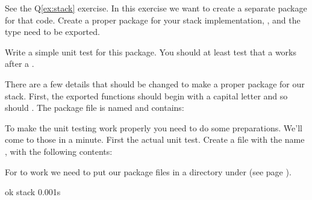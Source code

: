 \begin{Exercise}[title={Stack as package},difficulty=2]
\label{ex:stack-package}
\Question\label{ex:stack-package q1} 
See the Q\ref{ex:stack} exercise. In this exercise we want to create
a separate package for that code.
Create a proper package for your
stack implementation, ,  and the  type need to be
exported.

\Question\label{ex:stack-package q2} Write a simple unit test for this package.
You should at least test that a  works after a .

\end{Exercise}

\begin{Answer}
\Question There are a few details that should be changed to make a proper package
for our stack. First, the exported functions should begin with a capital 
letter and so should . The package file is named 
and contains:


\Question To make the unit testing work properly you need to do some
preparations. We'll come to those in a minute. First the actual unit test.
Create a file with the name , with the following contents:


For  to work we need to put our package files in a directory
under  (see page \pageref{"sec:settings used"}).

\begin{display}
\pr {}
\pr {}
\pr {}
\end{display}

\begin{display}
\pr {}
ok      stack   0.001s
\end{display}
\end{Answer}
